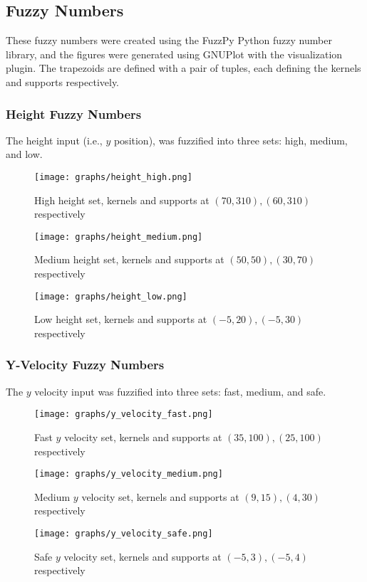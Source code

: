 \documentclass[12pt, article]{scrartcl}
\begin{document}
\subsection{Fuzzy Numbers}
These fuzzy numbers were created using the FuzzPy Python fuzzy number library, and the figures were generated using GNUPlot with the visualization plugin. The trapezoids are defined with a pair of tuples, each defining the kernels and supports respectively.

\subsubsection{Height Fuzzy Numbers}
The height input (i.e., $y$ position), was fuzzified into three sets: high, medium, and low.
\begin{figure}[h]
    \caption{High height set, kernels and supports at $(70, 310), (60, 310)$ respectively}
    \texttt{[image: graphs/height\_high.png]}
\end{figure}
\begin{figure}[h]
    \caption{Medium height set, kernels and supports at $(50, 50), (30, 70)$ respectively}
    \texttt{[image: graphs/height\_medium.png]}
\end{figure}
\begin{figure}[h]
    \caption{Low height set, kernels and supports at $(-5, 20), (-5, 30)$ respectively}
    \texttt{[image: graphs/height\_low.png]}
\end{figure}

\subsubsection{Y-Velocity Fuzzy Numbers}
The $y$ velocity input was fuzzified into three sets: fast, medium, and safe.
\begin{figure}[h]
    \caption{Fast $y$ velocity set, kernels and supports at $(35, 100), (25, 100)$ respectively}
    \texttt{[image: graphs/y\_velocity\_fast.png]}
\end{figure}
\begin{figure}[h]
    \caption{Medium $y$ velocity set, kernels and supports at $(9, 15), (4, 30)$ respectively}
    \texttt{[image: graphs/y\_velocity\_medium.png]}
\end{figure}
\begin{figure}[h]
    \caption{Safe $y$ velocity set, kernels and supports at $(-5, 3), (-5, 4)$ respectively}
    \texttt{[image: graphs/y\_velocity\_safe.png]}
\end{figure}
\end{document}
